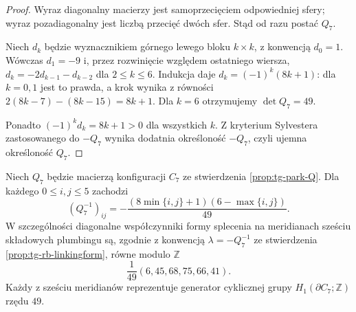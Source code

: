 \begin{proof}
Wyraz diagonalny macierzy jest samoprzecięciem
odpowiedniej sfery; wyraz pozadiagonalny jest liczbą
przecięć dwóch sfer. Stąd od razu postać $Q_7$.

Niech $d_k$ będzie wyznacznikiem górnego lewego bloku
$k\times k$, z konwencją $d_0=1$. Wówczas
$d_1=-9$ i, przez rozwinięcie względem ostatniego wiersza,
$d_k=-2d_{k-1}-d_{k-2}$ dla $2\le k\le6$.
Indukcja daje $d_k=(-1)^k(8k+1)$: dla $k=0,1$
jest to prawda, a krok wynika z równości
$2(8k-7)-(8k-15)=8k+1$.
Dla $k=6$ otrzymujemy $\det Q_7=49$.

Ponadto $(-1)^k d_k=8k+1>0$ dla wszystkich $k$.
Z kryterium Sylvestera zastosowanego do $-Q_7$
wynika dodatnia określoność $-Q_7$, czyli ujemna
określoność $Q_7$.
\end{proof}

\begin{lemat}
\label{lem:tg-park-Q-inverse-full}
Niech $Q_7$ będzie macierzą konfiguracji $C_7$
ze stwierdzenia \ref{prop:tg-park-Q}. Dla każdego
$0\le i,j\le5$ zachodzi
\[
(Q_7^{-1})_{ij}=
-\frac{(8\min\{i,j\}+1)(6-\max\{i,j\})}{49}.
\]
W szczególności diagonalne współczynniki formy
splecenia na meridianach sześciu składowych
plumbingu są, zgodnie z konwencją
$\lambda=-Q_7^{-1}$ ze stwierdzenia
\ref{prop:tg-rb-linkingform}, równe modulo $\mathbb Z$
\[
\frac1{49}(6,45,68,75,66,41).
\]
Każdy z sześciu meridianów reprezentuje generator
cyklicznej grupy $H_1(\partial C_7;\mathbb Z)$
rzędu $49$.
\end{lemat}

